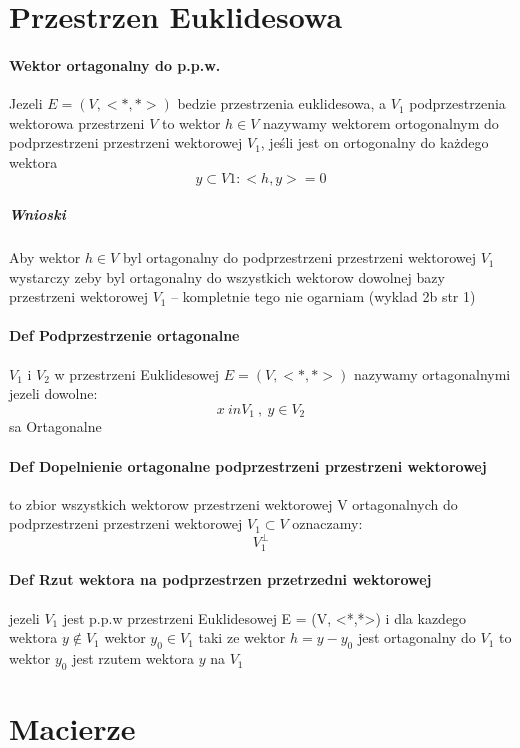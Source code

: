 \documentclass[a4paper]{article}
\begin{document}
\section{Przestrzen Euklidesowa}
\paragraph{Wektor ortagonalny do p.p.w.}
Jezeli $ E = (V, <*,*>) $ bedzie przestrzenia euklidesowa, a $ V_{1}$
podprzestrzenia wektorowa przestrzeni $V$ to wektor $h \in V$ nazywamy wektorem ortogonalnym do podprzestrzeni przestrzeni wektorowej $V_1$, jeśli jest on ortogonalny do każdego wektora
\begin{equation}
    y \subset V1: <h, y> = 0
\end{equation}
\subparagraph{Wnioski}
Aby wektor $h\in V$ byl ortagonalny do podprzestrzeni przestrzeni wektorowej $V_1$ wystarczy zeby byl ortagonalny do wszystkich  wektorow dowolnej bazy przestrzeni wektorowej $V_1$ -- kompletnie tego nie ogarniam (wyklad 2b str 1)

\paragraph{Def Podprzestrzenie ortagonalne} $V_1$ i $V_2$ w przestrzeni Euklidesowej $E = (V,<*,*>)$ nazywamy ortagonalnymi jezeli dowolne:
\begin{equation}
    x \ in V_1 \ , \ y \in V_2
\end{equation}
sa Ortagonalne
\paragraph{Def Dopelnienie ortagonalne podprzestrzeni przestrzeni wektorowej}
to zbior wszystkich wektorow przestrzeni wektorowej V ortagonalnych do podprzestrzeni przestrzeni wektorowej $V_1 \subset V $ oznaczamy:
\begin{equation}
    V_1^{\perp}
\end{equation}
\paragraph{Def Rzut wektora na podprzestrzen przetrzedni wektorowej}
jezeli $V_1$ jest p.p.w przestrzeni Euklidesowej E = (V, <*,*>) i dla kazdego wektora $y \notin V_1$ wektor $y_0 \in V_1$ taki ze wektor $h = y - y_0$ jest ortagonalny do $V_1$ to wektor $y_0$ jest rzutem wektora $y$ na $V_1$
\section{Macierze}
\end{document}
